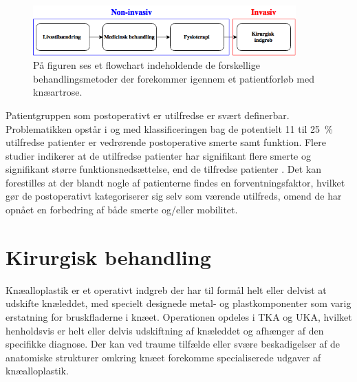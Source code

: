 \begin{figure}[H]
	\centering
	\includegraphics[width=0.9\textwidth]{../figures/bProblemanalyse/flowchart_behandlingsforloeb.png}
	\caption{På figuren ses et flowchart indeholdende de forskellige behandlingsmetoder der forekommer igennem et patientforløb med knæartrose.}
	\label{fig:flow_behandlingsfaser}
\end{figure}\vspace{-.25cm}

Patientgruppen som postoperativt er utilfredse er svært definerbar. Problematikken opstår i og med klassificeringen bag de potentielt 11 til 25~\% utilfredse patienter er vedrørende postoperative smerte samt funktion. Flere studier indikerer at de utilfredse patienter har signifikant flere smerte og signifikant større funktionsnedsættelse, end de tilfredse patienter \citep{Bourne2010} \citep{Jacobs2014}. Det kan forestilles at der blandt nogle af patienterne findes en forventningsfaktor, hvilket gør de postoperativt kategoriserer sig selv som værende utilfreds, omend de har opnået en forbedring af både smerte og/eller mobilitet.


\section{Kirurgisk behandling}
Knæalloplastik er et operativt indgreb der har til formål helt eller delvist at udskifte knæleddet, med specielt designede metal- og plastkomponenter som varig erstatning for bruskfladerne i knæet. Operationen opdeles i TKA og UKA, hvilket henholdsvis er helt eller delvis udskiftning af knæleddet og afhænger af den specifikke diagnose. Der kan ved traume tilfælde eller svære beskadigelser af de anatomiske strukturer omkring knæet forekomme specialiserede udgaver af knæalloplastik.

